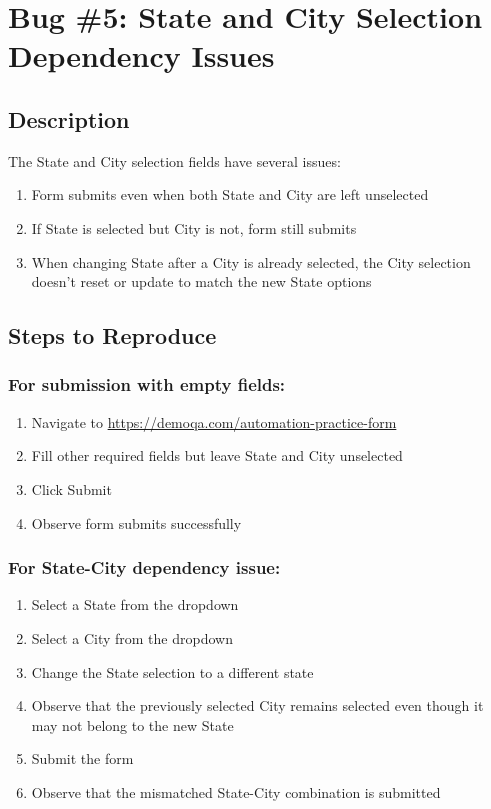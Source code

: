 \section{Bug \#5: State and City Selection Dependency Issues}


\subsection*{Description}
The State and City selection fields have several issues:
\begin{enumerate}
    \item Form submits even when both State and City are left unselected
    \item If State is selected but City is not, form still submits
    \item When changing State after a City is already selected, the City selection doesn't reset or update to match the new State options
\end{enumerate}

\subsection*{Steps to Reproduce}
\subsubsection*{For submission with empty fields:}
\begin{enumerate}
    \item Navigate to \url{https://demoqa.com/automation-practice-form}
    \item Fill other required fields but leave State and City unselected
    \item Click Submit
    \item Observe form submits successfully
\end{enumerate}

\subsubsection*{For State-City dependency issue:}
\begin{enumerate}
    \item Select a State from the dropdown
    \item Select a City from the dropdown
    \item Change the State selection to a different state
    \item Observe that the previously selected City remains selected even though it may not belong to the new State
    \item Submit the form
    \item Observe that the mismatched State-City combination is submitted
\end{enumerate}


